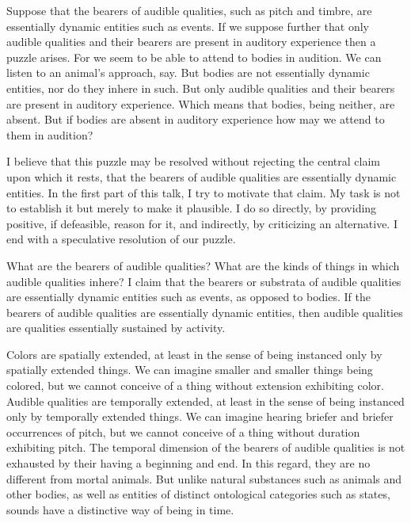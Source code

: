 \documentclass[12pt]{article}
\title{\mytitle}
\author{\myauthor}
\date{} %
\begin{document}
\maketitle

\setlength{\parindent}{1em}


Suppose that the bearers of audible qualities, such as pitch and timbre, are essentially dynamic entities such as events. If we suppose further that only audible qualities and their bearers are present in auditory experience then a puzzle arises. For we seem to be able to attend to bodies in audition. We can listen to an animal’s approach, say. But bodies are not essentially dynamic entities, nor do they inhere in such. But only audible qualities and their bearers are present in auditory experience. Which means that bodies, being neither, are absent. But if bodies are absent in auditory experience how may we attend to them in audition?

I believe that this puzzle may be resolved without rejecting the central claim upon which it rests, that the bearers of audible qualities are essentially dynamic entities. In the first part of this talk, I try to motivate that claim. My task is not to establish it but merely to make it plausible. I do so directly, by providing positive, if defeasible, reason for it, and indirectly, by criticizing an alternative. I end with a speculative resolution of our puzzle.

What are the bearers of audible qualities? What are the kinds of things in which audible qualities inhere? I claim that the bearers or substrata of audible qualities are essentially dynamic entities such as events, as opposed to bodies. If the bearers of audible qualities are essentially dynamic entities, then audible qualities are qualities essentially sustained by activity.

Colors are spatially extended, at least in the sense of being instanced only by spatially extended things. We can imagine smaller and smaller things being colored, but we cannot conceive of a thing without extension exhibiting color. Audible qualities are temporally extended, at least in the sense of being instanced only by temporally extended things. We can imagine hearing briefer and briefer occurrences of pitch, but we cannot conceive of a thing without duration exhibiting pitch. The temporal dimension of the bearers of audible qualities is not exhausted by their having a beginning and end. In this regard, they are no different from mortal animals. But unlike natural substances such as animals and other bodies, as well as entities of distinct ontological categories such as states, sounds have a distinctive way of being in time.
\end{document}
